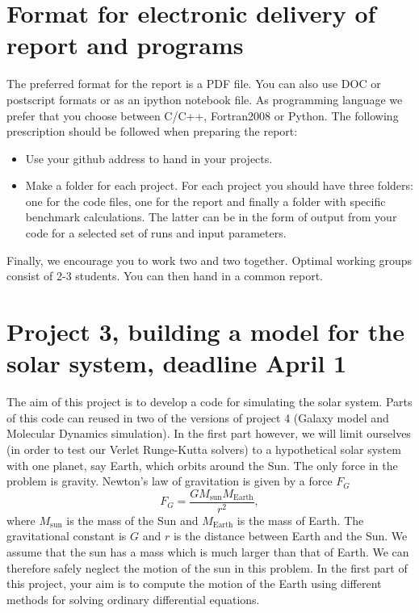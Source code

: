 \documentclass[11pt,a4wide]{article}
\begin{document}
\section*{Format for electronic delivery of report and programs}
%
The preferred format for the report is a PDF file. You can also
use DOC or postscript formats or as an ipython notebook file. 
As programming language we prefer that you choose between C/C++, Fortran2008 or Python.
The following prescription should be followed when preparing the report:
\begin{itemize}
\item Use your github address  to hand in your projects.
\item Make a folder for each project. For each project you should have three folders: one for the code files, one for the report and finally a folder with specific benchmark calculations. The latter can be in the form of output from your code
for a selected set of runs and input parameters. 

\end{itemize}

Finally, 
we encourage you to work two and two together. Optimal working groups consist of 
2-3 students. You can then hand in a common report. 




\section*{Project 3, building a model for the solar system, deadline  April 1}
The aim of this project is to develop a code for simulating the solar system. Parts of this code can reused in two of the versions of project 4 (Galaxy model and Molecular Dynamics simulation).  
In the first part however, we will limit ourselves (in order to test our Verlet Runge-Kutta solvers) 
to a hypothetical solar system
with one planet, say Earth, which orbits around the Sun.
The only force in the problem is gravity. Newton's law of gravitation  is given by a force $F_G$
\[
F_G=\frac{GM_{\mathrm{sun}}M_{\mathrm{Earth}}}{r^2},
\]
where $M_{\mathrm{sun}}$ is the mass of the Sun and $M_{\mathrm{Earth}}$ is the mass of Earth. The gravitational constant is $G$ and $r$ is the distance between Earth and the Sun.
We assume that the sun has a mass which is much larger 
than that of Earth. We can therefore safely neglect the 
motion of the sun in this problem.  In the first part of this project, your aim is to compute the motion
of the Earth using different methods for solving ordinary differential equations.
\end{document}
